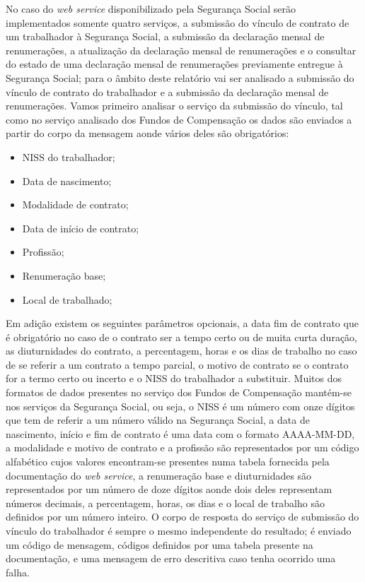 \documentclass[sigplan]{acmart}
\begin{document}
No caso do \textit{web service} disponibilizado pela Segurança Social serão implementados somente quatro serviços, a submissão do vínculo de contrato de um trabalhador à Segurança Social, a submissão da declaração mensal de renumerações, a atualização da declaração mensal de renumerações e o consultar do estado de uma declaração mensal de renumerações previamente entregue à Segurança Social; para o âmbito deste relatório vai ser analisado a submissão do vínculo de contrato do trabalhador e a submissão da declaração mensal de renumerações. Vamos primeiro analisar o serviço da submissão do vínculo, tal como no serviço analisado dos Fundos de Compensação os dados são enviados a partir do corpo da mensagem aonde vários deles são obrigatórios:
\begin{itemize}
  \item NISS do trabalhador;
  \item Data de nascimento;
  \item Modalidade de contrato;
  \item Data de início de contrato;
  \item Profissão;
  \item Renumeração base;
  \item Local de trabalhado;
\end{itemize}
Em adição existem os seguintes parâmetros opcionais, a data fim de contrato que é obrigatório no caso de o contrato ser a tempo certo ou de muita curta duração, as diuturnidades do contrato, a percentagem, horas e os dias de trabalho no caso de se referir a um contrato a tempo parcial, o motivo de contrato se o contrato for a termo certo ou incerto e o NISS do trabalhador a substituir. Muitos dos formatos de dados presentes no serviço dos Fundos de Compensação mantém-se nos serviços da Segurança Social, ou seja, o NISS é um número com onze dígitos que tem de referir a um número válido na Segurança Social, a data de nascimento, início e fim de contrato é uma data com o formato AAAA-MM-DD, a modalidade e motivo de contrato e a profissão são representados por um código alfabético cujos valores encontram-se presentes numa tabela fornecida pela documentação do \textit{web service}, a renumeração base e diuturnidades são representados por um número de doze dígitos aonde dois deles representam números decimais, a percentagem, horas, os dias e o local de trabalho são definidos por um número inteiro. O corpo de resposta do serviço de submissão do vínculo do trabalhador é sempre o mesmo independente do resultado; é enviado um código de mensagem, códigos definidos por uma tabela presente na documentação, e uma mensagem de erro descritiva caso tenha ocorrido uma falha.
\end{document}
